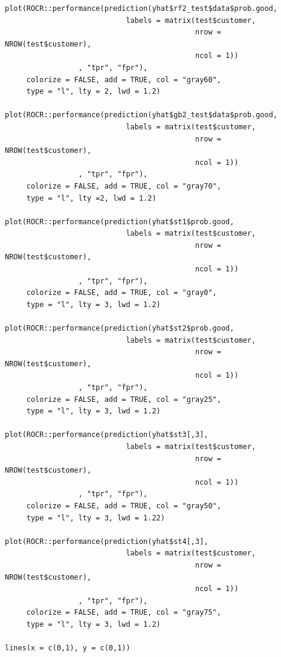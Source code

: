 \documentclass[12pt]{article}
\begin{document}
\begin{lstlisting}
plot(ROCR::performance(prediction(yhat$rf2_test$data$prob.good, 
                            labels = matrix(test$customer, 
                                            nrow = NROW(test$customer), 
                                            ncol = 1))
                 , "tpr", "fpr"),
     colorize = FALSE, add = TRUE, col = "gray60", 
     type = "l", lty = 2, lwd = 1.2)

plot(ROCR::performance(prediction(yhat$gb2_test$data$prob.good, 
                            labels = matrix(test$customer, 
                                            nrow = NROW(test$customer), 
                                            ncol = 1))
                 , "tpr", "fpr"),
     colorize = FALSE, add = TRUE, col = "gray70", 
     type = "l", lty =2, lwd = 1.2)

plot(ROCR::performance(prediction(yhat$st1$prob.good, 
                            labels = matrix(test$customer, 
                                            nrow = NROW(test$customer), 
                                            ncol = 1))
                 , "tpr", "fpr"),
     colorize = FALSE, add = TRUE, col = "gray0", 
     type = "l", lty = 3, lwd = 1.2)

plot(ROCR::performance(prediction(yhat$st2$prob.good, 
                            labels = matrix(test$customer, 
                                            nrow = NROW(test$customer), 
                                            ncol = 1))
                 , "tpr", "fpr"),
     colorize = FALSE, add = TRUE, col = "gray25",
     type = "l", lty = 3, lwd = 1.2)

plot(ROCR::performance(prediction(yhat$st3[,3], 
                            labels = matrix(test$customer, 
                                            nrow = NROW(test$customer), 
                                            ncol = 1))
                 , "tpr", "fpr"),
     colorize = FALSE, add = TRUE, col = "gray50", 
     type = "l", lty = 3, lwd = 1.22)

plot(ROCR::performance(prediction(yhat$st4[,3], 
                            labels = matrix(test$customer, 
                                            nrow = NROW(test$customer), 
                                            ncol = 1))
                 , "tpr", "fpr"),
     colorize = FALSE, add = TRUE, col = "gray75", 
     type = "l", lty = 3, lwd = 1.2)

lines(x = c(0,1), y = c(0,1))


\end{lstlisting}
\end{document}
